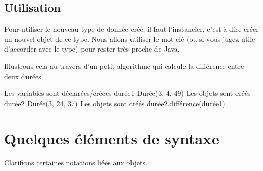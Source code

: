 	\subsection{Utilisation}

		Pour utiliser le nouveau type de donnée créé,
		il faut l'instancier, c'est-à-dire créer un nouvel objet de ce type.
		Nous allons utiliser le mot clé 
		(ou  si vous jugez utile d'accorder avec le type)
		pour rester très proche de Java.
		
		Illustrons cela au travers d'un petit algorithme
		qui calcule la différence entre deux durées.
		
		\begin{LDA}
					\RComment Les variables sont déclarées/créées
				\Let durée1 \Gets {} Durée(3, 4, 49)	\RComment Les objets sont créés
				\Let durée2 \Gets {} Durée(3, 24, 37)	\RComment Les objets sont créés
				\Write durée2.différence(durée1)
			\EndAlgo
		\end{LDA}

\section{Quelques éléments de syntaxe}

	Clarifions certaines notations liées aux objets.

